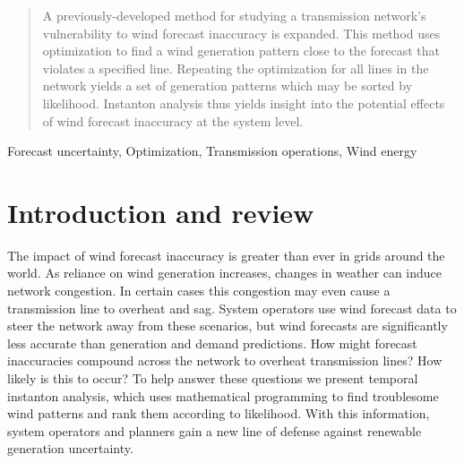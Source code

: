 \documentclass[conference]{IEEEtran}
\begin{document}
\begin{abstract}
A previously-developed method for studying a transmission network's vulnerability to wind forecast inaccuracy is expanded. This method uses optimization to find a wind generation pattern close to the forecast that violates a specified line. Repeating the optimization for all lines in the network yields a set of generation patterns which may be sorted by likelihood. Instanton analysis thus yields insight into the potential effects of wind forecast inaccuracy at the system level.
\end{abstract}

\begin{IEEEkeywords}
Forecast uncertainty, Optimization, Transmission operations, Wind energy
\end{IEEEkeywords}


\section{Introduction and review}\label{sec:intro}

The impact of wind forecast inaccuracy is greater than ever in grids around the world. As reliance on wind generation increases, changes in weather can induce network congestion. In certain cases this congestion may even cause a transmission line to overheat and sag. System operators use wind forecast data to steer the network away from these scenarios, but wind forecasts are significantly less accurate than generation and demand predictions. How might forecast inaccuracies compound across the network to overheat transmission lines? How likely is this to occur? To help answer these questions we present temporal instanton analysis, which uses mathematical programming to find troublesome wind patterns and rank them according to likelihood. With this information, system operators and planners gain a new line of defense against renewable generation uncertainty.
\end{document}
